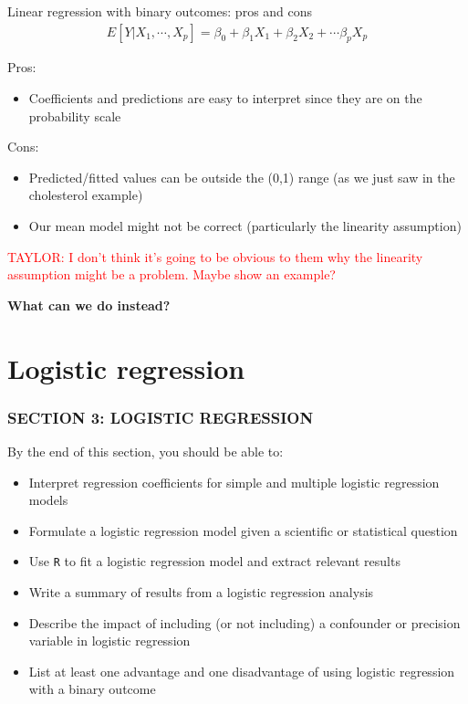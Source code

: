 \documentclass[10pt,t]{beamer}
\begin{document}
\begin{frame}{Linear regression with binary outcomes: pros and cons}
	\begin{align*} 
		E[Y|X_1,\cdots,X_p] = \beta_0 + \beta_1 X_1 + \beta_2 X_2 + \cdots \beta_p X_p 
	\end{align*}
	
	Pros: 
	\begin{itemize}
		\item Coefficients and predictions are easy to interpret since they are on the probability scale
	\end{itemize}
	
	Cons: 
	\begin{itemize}
		\item Predicted/fitted values can be outside the (0,1) range (as we just saw in the cholesterol example)
		\item Our mean model might not be correct (particularly the linearity assumption)%
	\end{itemize}
\textcolor{red}{TAYLOR: I don't think it's going to be obvious to them why the linearity assumption might be a problem. Maybe show an example?}
	
	\textbf{What can we do instead?}
\end{frame}


\section{Logistic regression}
\begin{frame}
	\frametitle{SECTION 3: LOGISTIC REGRESSION}
	By the end of this section, you should be able to:
	\begin{itemize}
		\item Interpret regression coefficients for simple and multiple logistic regression models
		\item Formulate a logistic regression model given a scientific or statistical question 
		\item Use \texttt{R} to fit a logistic regression model and extract relevant results
		\item Write a summary of results from a logistic regression analysis
		\item Describe the impact of including (or not including) a confounder or precision variable in logistic regression
		\item List at least one advantage and one disadvantage of using logistic regression with a binary outcome
	\end{itemize}
\end{frame}
\end{document}
